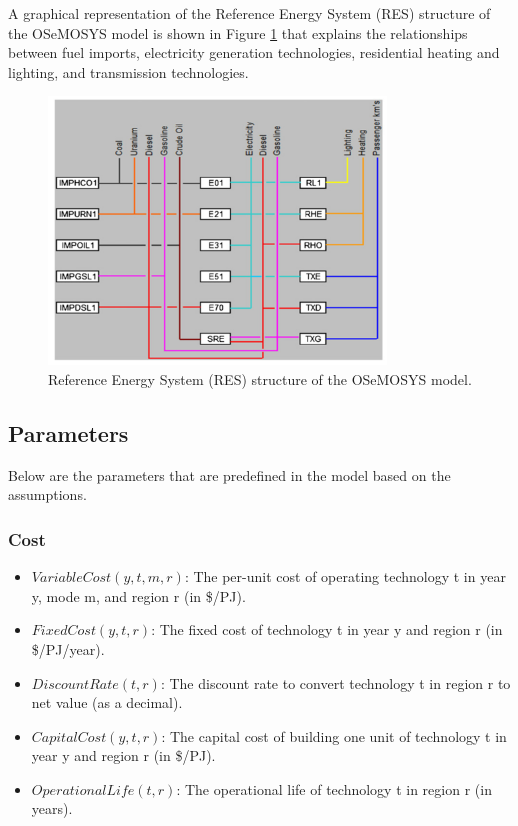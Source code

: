 \documentclass[11pt]{article}
\begin{document}
A graphical representation of the Reference Energy System (RES) structure of the OSeMOSYS model is shown in Figure \ref{fig:osemosys_structure} that explains the relationships between fuel imports, electricity generation technologies, residential heating and lighting, and transmission technologies.
\begin{figure}[H]
    \centering
    \includegraphics[width=0.8\textwidth]{RES}
    \caption{Reference Energy System (RES) structure of the OSeMOSYS model.}
    \label{fig:osemosys_structure}
\end{figure}

\subsection{Parameters}
Below are the parameters that are predefined in the model based on the assumptions.

\subsubsection{Cost}
\begin{itemize}
    \item $VariableCost(y,t,m,r)$: The per-unit cost of operating technology t in year y, mode m, and region r (in \$/PJ).
    \item $FixedCost(y,t,r)$: The fixed cost of technology t in year y and region r (in \$/PJ/year).
    \item $DiscountRate(t,r)$: The discount rate to convert technology t in region r to net value (as a decimal).
    \item $CapitalCost(y,t,r)$: The capital cost of building one unit of technology t in year y and region r (in \$/PJ).
    \item $OperationalLife(t,r)$: The operational life of technology t in region r (in years).
\end{itemize}
\end{document}
